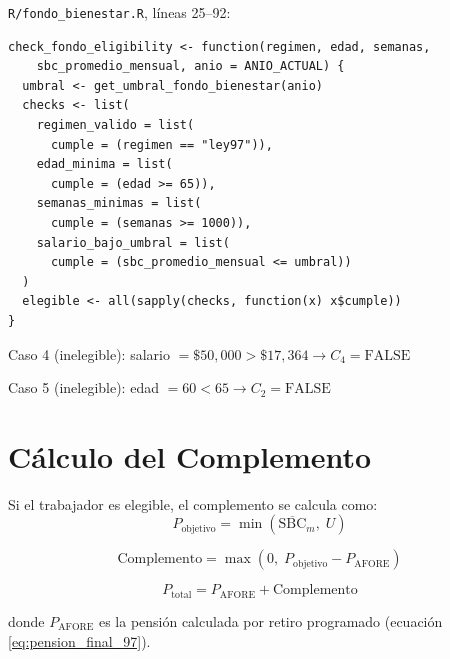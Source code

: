 \documentclass[11pt,a4paper]{report}
\theoremstyle{remark}
\begin{document}
\begin{tcolorbox}[colback=orange!5!white, colframe=orange!75!black, title=\textbf{Aplicaci\'on en C\'odigo}]
\texttt{R/fondo\_bienestar.R}, l\'ineas 25--92:
\begin{lstlisting}
check_fondo_eligibility <- function(regimen, edad, semanas,
    sbc_promedio_mensual, anio = ANIO_ACTUAL) {
  umbral <- get_umbral_fondo_bienestar(anio)
  checks <- list(
    regimen_valido = list(
      cumple = (regimen == "ley97")),
    edad_minima = list(
      cumple = (edad >= 65)),
    semanas_minimas = list(
      cumple = (semanas >= 1000)),
    salario_bajo_umbral = list(
      cumple = (sbc_promedio_mensual <= umbral))
  )
  elegible <- all(sapply(checks, function(x) x$cumple))
}
\end{lstlisting}

Caso 4 (inelegible): salario $= \$50{,}000 > \$17{,}364 \to C_4 = \text{FALSE}$

Caso 5 (inelegible): edad $= 60 < 65 \to C_2 = \text{FALSE}$
\end{tcolorbox}

\section{C\'alculo del Complemento}

\begin{tcolorbox}[colback=blue!5!white, colframe=blue!75!black, title=\textbf{Definici\'on Formal}]
Si el trabajador es elegible, el complemento se calcula como:
\begin{equation}
P_{\text{objetivo}} = \min(\overline{\text{SBC}}_m, \; U)
\label{eq:pension_objetivo}
\end{equation}

\begin{equation}
\text{Complemento} = \max(0, \; P_{\text{objetivo}} - P_{\text{AFORE}})
\label{eq:complemento}
\end{equation}

\begin{equation}
P_{\text{total}} = P_{\text{AFORE}} + \text{Complemento}
\label{eq:pension_total_fondo}
\end{equation}

donde $P_{\text{AFORE}}$ es la pensi\'on calculada por retiro programado (ecuaci\'on \eqref{eq:pension_final_97}).
\end{tcolorbox}
\end{document}
